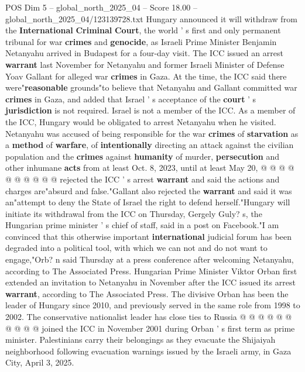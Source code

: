 \begin{textsample}{POS Dim 5 – global\_north\_2025\_04 – Score 18.00 – global\_north\_2025\_04/123139728.txt}  \label{ex:f5_pos_103}
Hungary announced it will withdraw from the \textbf{International} \textbf{Criminal} \textbf{Court}, the world ' s first and only permanent tribunal for war \textbf{crimes} and \textbf{genocide}, as Israeli Prime Minister Benjamin Netanyahu arrived in Budapest for a four-day visit.
The ICC issued an arrest \textbf{warrant} last November for Netanyahu and former Israeli Minister of Defense Yoav Gallant for alleged war \textbf{crimes} in Gaza.
At the time, the ICC said there were"\textbf{reasonable} grounds"to believe that Netanyahu and Gallant committed war \textbf{crimes} in Gaza, and added that Israel ' s acceptance of the \textbf{court} ' s \textbf{jurisdiction} is not required.
Israel is not a member of the ICC.
As a member of the ICC, Hungary would be obligated to arrest Netanyahu when he visited.
Netanyahu was accused of being responsible for the war \textbf{crimes} of \textbf{starvation} as a \textbf{method} of \textbf{warfare}, of \textbf{intentionally} directing an attack against the civilian population and the \textbf{crimes} against \textbf{humanity} of murder, \textbf{persecution} and other inhumane \textbf{acts} from at least Oct. 8, 2023, until at least May 20, @ @ @ @ @ @ @ @ @ @ rejected the ICC ' s arrest \textbf{warrant} and said the actions and charges are"absurd and false."Gallant also rejected the \textbf{warrant} and said it was an"attempt to deny the State of Israel the right to defend herself."Hungary will initiate its withdrawal from the ICC on Thursday, Gergely Guly? s, the Hungarian prime minister ' s chief of staff, said in a post on Facebook."I am convinced that this otherwise important \textbf{international} judicial forum has been degraded into a political tool, with which we can not and do not want to engage,"Orb? n said Thursday at a press conference after welcoming Netanyahu, according to The Associated Press.
Hungarian Prime Minister Viktor Orban first extended an invitation to Netanyahu in November after the ICC issued its arrest \textbf{warrant}, according to The Associated Press.
The divisive Orban has been the leader of Hungary since 2010, and previously served in the same role from 1998 to 2002.
The conservative nationalist leader has close ties to Russia @ @ @ @ @ @ @ @ @ @ joined the ICC in November 2001 during Orban ' s first term as prime minister.
Palestinians carry their belongings as they evacuate the Shijaiyah neighborhood following evacuation warnings issued by the Israeli army, in Gaza City, April 3, 2025.

\end{textsample}
